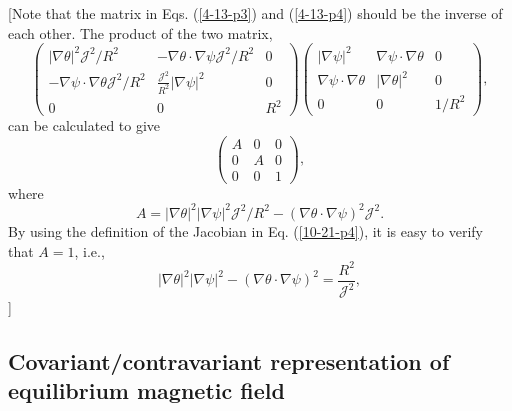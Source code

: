 \documentclass{article}
\begin{document}
[Note that the matrix in Eqs. (\ref{4-13-p3}) and (\ref{4-13-p4}) should be
the inverse of each other. The product of the two matrix,
\begin{equation}
  \left(\begin{array}{ccc}
    | \nabla \theta |^2 \mathcal{J}^2 / R^2 & - \nabla \theta \cdot \nabla
    \psi \mathcal{J}^2 / R^2 & 0\\
    - \nabla \psi \cdot \nabla \theta \mathcal{J}^2 / R^2 &
    \frac{\mathcal{J}^2}{R^2} | \nabla \psi |^2 & 0\\
    0 & 0 & R^2
  \end{array}\right) \left(\begin{array}{ccc}
    | \nabla \psi |^2 & \nabla \psi \cdot \nabla \theta & 0\\
    \nabla \psi \cdot \nabla \theta & | \nabla \theta |^2 & 0\\
    0 & 0 & 1 / R^2
  \end{array}\right),
\end{equation}
can be calculated to give
\[ \left(\begin{array}{ccc}
     A & 0 & 0\\
     0 & A & 0\\
     0 & 0 & 1
   \end{array}\right), \]
where
\[ A = | \nabla \theta |^2 | \nabla \psi |^2 \mathcal{J}^2 / R^2 - (\nabla
   \theta \cdot \nabla \psi)^2 \mathcal{J}^2 . \]
By using the definition of the Jacobian in Eq. (\ref{10-21-p4}), it is easy to
verify that $A = 1$, i.e.,
\begin{equation}
  \label{4-13-p7} | \nabla \theta |^2 | \nabla \psi |^2 - (\nabla \theta \cdot
  \nabla \psi)^2 = \frac{R^2}{\mathcal{J}^2},
\end{equation}
]

\subsection{Covariant/contravariant representation of equilibrium magnetic
field}
\end{document}
